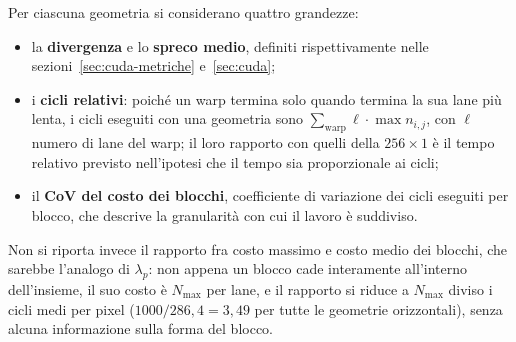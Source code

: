 Per ciascuna geometria si considerano quattro grandezze:
\begin{itemize}
    \item la \textbf{divergenza} e lo \textbf{spreco medio}, definiti
    rispettivamente nelle sezioni~\ref{sec:cuda-metriche} e~\ref{sec:cuda};
    \item i \textbf{cicli relativi}: poiché un warp termina solo quando termina
    la sua lane più lenta, i cicli eseguiti con una geometria sono
    $\sum_{\text{warp}} \ell \cdot \max n_{i,j}$, con $\ell$ numero di lane del
    warp; il loro rapporto con quelli della $256{\times}1$ è il tempo relativo
    previsto nell'ipotesi che il tempo sia proporzionale ai cicli;
    \item il \textbf{CoV del costo dei blocchi}, coefficiente di variazione dei
    cicli eseguiti per blocco, che descrive la granularità con cui il lavoro è
    suddiviso.
\end{itemize}
Non si riporta invece il rapporto fra costo massimo e costo medio dei blocchi,
che sarebbe l'analogo di $\lambda_p$: non appena un blocco cade interamente
all'interno dell'insieme, il suo costo è $N_{\max}$ per lane, e il rapporto si
riduce a $N_{\max}$ diviso i cicli medi per pixel ($1000/286{,}4 = 3{,}49$ per
tutte le geometrie orizzontali), senza alcuna informazione sulla forma del
blocco.
\vspace{2,5mm}
